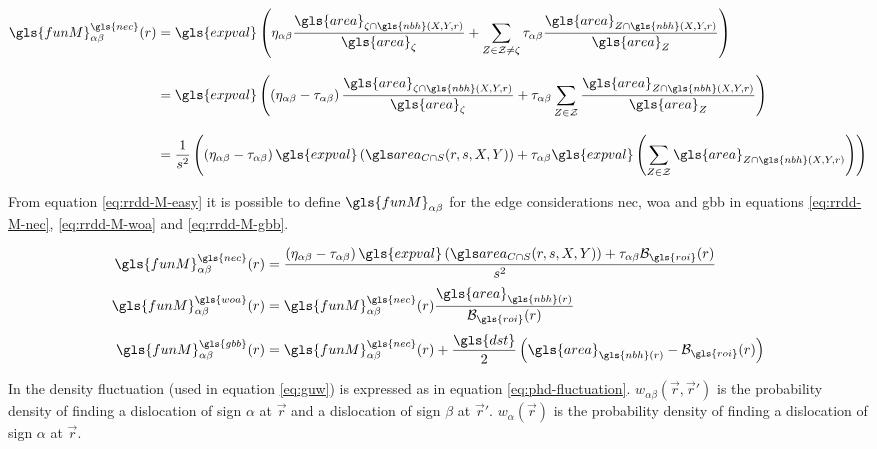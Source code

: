 \begin{align}
  \gls{funM}_{\alpha \beta}^{\gls{nec}} (r) &=
    \gls{expval} \left( \eta_{\alpha \beta} \frac{\gls{area}_{\zeta \cap \gls{nbh}(X, Y, r)}}{\gls{area}_\zeta} + \sum_{Z \in \mathcal{Z} \neq \zeta} \tau_{\alpha \beta} \frac{\gls{area}_{Z \cap \gls{nbh}(X, Y, r)}}{\gls{area}_Z} \right)
    \label{eq:rrdd-M}
  \\[3mm]
  &=
    \gls{expval} \left( \left( \eta_{\alpha \beta} - \tau_{\alpha \beta} \right) \frac{\gls{area}_{\zeta \cap \gls{nbh}(X, Y, r)}}{\gls{area}_\zeta} + \tau_{\alpha \beta} \sum_{Z \in \mathcal{Z}} \frac{\gls{area}_{Z \cap \gls{nbh}(X, Y, r)}}{\gls{area}_Z} \right)
  \\[3mm]
  &=
    \frac{1}{s^2} \left( \left( \eta_{\alpha \beta} - \tau_{\alpha \beta} \right) \gls{expval} \left( \cirsqr(r, s, X, Y) \right) + \tau_{\alpha \beta} \gls{expval} \left( \sum_{Z \in \mathcal{Z}} \gls{area}_{Z \cap \gls{nbh}(X, Y, r)} \right) \right)
    \label{eq:rrdd-M-easy}
\end{align}

\medskip

From equation \eqref{eq:rrdd-M-easy} it is possible to define \( \gls{funM}_{\alpha \beta} \) for the edge considerations \gls{nec}, \gls{woa} and \gls{gbb} in equations \eqref{eq:rrdd-M-nec}, \eqref{eq:rrdd-M-woa} and \eqref{eq:rrdd-M-gbb}.

\begin{align}
  \gls{funM}^{\gls{nec}}_{\alpha \beta} (r) &=
    \frac{\left( \eta_{\alpha \beta} - \tau_{\alpha \beta} \right) \gls{expval} \left( \cirsqr(r, s, X, Y) \right) + \tau_{\alpha \beta} \mathcal{B}_{\gls{roi}}(r)}{s^2}
    \label{eq:rrdd-M-nec}
  \\[0.1cm]
  \gls{funM}^{\gls{woa}}_{\alpha \beta} (r) &=
    \gls{funM}^{\gls{nec}}_{\alpha \beta} (r) \frac{\gls{area}_{\gls{nbh}(r)}}{\mathcal{B}_{\gls{roi}}(r)}
    \label{eq:rrdd-M-woa}
  \\[0.1cm]
  \gls{funM}^{\gls{gbb}}_{\alpha \beta} (r) &=
    \gls{funM}^{\gls{nec}}_{\alpha \beta} (r) + \frac{\gls{dst}}{2} \left( \gls{area}_{\gls{nbh}(r)} - \mathcal{B}_{\gls{roi}}(r) \right)
    \label{eq:rrdd-M-gbb}
\end{align}

In \cite{VB1994} the density fluctuation (used in equation \eqref{eq:guw}) is expressed as in equation \eqref{eq:phd-fluctuation}.
\( w_{\alpha \beta} \left( \vec{r}, \vec{r}' \right) \) is the probability density of finding a dislocation of sign \( \alpha \) at \( \vec{r} \) and a dislocation of sign \( \beta \) at \( \vec{r}' \).
\( w_{\alpha} \left( \vec{r} \right) \) is the probability density of finding a dislocation of sign \( \alpha \) at \( \vec{r} \).

